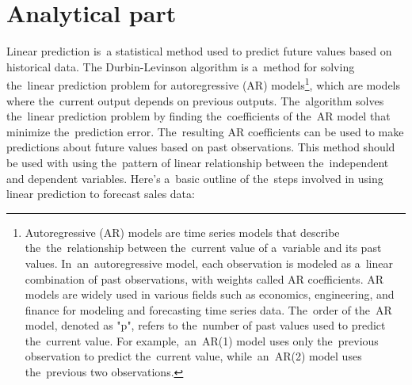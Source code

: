 
\chapter{Analytical part}\label{sec:analytical}

Linear prediction is~a statistical method used to predict future values based on historical data.
The Durbin-Levinson algorithm is a~method for solving the~linear prediction problem for autoregressive (AR)
models\footnote{Autoregressive (AR) models are time series models that describe the~the~relationship between the~current
value of a~variable and its past values. In~an~autoregressive model, each observation is modeled as a~linear
combination of past observations, with weights called AR coefficients. AR models are widely used in various fields
such as economics, engineering, and finance for modeling and forecasting time series data. The~order of the~AR model, denoted as "p", refers to the~number of past values used to predict the~current value. For example,~an~AR(1) model uses
only the~previous observation to predict the~current value, while~an~AR(2) model uses the~previous two observations.},
which are models where the~current output depends on previous outputs. The~algorithm solves the~linear prediction
problem by finding the~coefficients of the~AR model that minimize the~prediction error. The~resulting AR coefficients
can be used to make predictions about future values based on past observations. This method should be used with
using the~pattern of linear relationship between the~independent and dependent variables.
Here's a~basic outline of the~steps involved in using linear prediction to forecast sales data:\\
